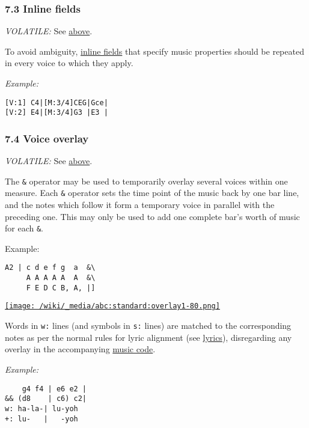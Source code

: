 \hypertarget{inline_fields}{\subsubsection{7.3 Inline
fields}\label{inline_fields}}

\emph{VOLATILE:} See \protect\hyperlink{multiple_voices}{above}.

To avoid ambiguity, \protect\hyperlink{inline_field_definition}{inline
fields} that specify music properties should be repeated in every voice
to which they apply.

\emph{Example:}

\begin{verbatim}
[V:1] C4|[M:3/4]CEG|Gce|
[V:2] E4|[M:3/4]G3 |E3 |
\end{verbatim}

\hypertarget{voice_overlay}{\subsubsection{7.4 Voice
overlay}\label{voice_overlay}}

\emph{VOLATILE:} See \protect\hyperlink{multiple_voices}{above}.

The \texttt{\&} operator may be used to temporarily overlay several
voices within one measure. Each \texttt{\&} operator sets the time point
of the music back by one bar line, and the notes which follow it form a
temporary voice in parallel with the preceding one. This may only be
used to add one complete bar's worth of music for each \texttt{\&}.

Example:

\begin{verbatim}
A2 | c d e f g  a  &\
     A A A A A  A  &\
     F E D C B, A, |]
\end{verbatim}

\href{/wiki/_detail/abc:standard:overlay1-80.png?id=abc\%3Astandard\%3Av2.1}{\texttt{[image: /wiki/\_media/abc:standard:overlay1-80.png]}}

Words in \texttt{w:} lines (and symbols in \texttt{s:} lines) are
matched to the corresponding notes as per the normal rules for lyric
alignment (see \protect\hyperlink{lyrics}{lyrics}), disregarding any
overlay in the accompanying
\protect\hyperlink{music_code_definition}{music code}.

\emph{Example:}

\begin{verbatim}
    g4 f4 | e6 e2 |
&& (d8    | c6) c2|
w: ha-la-| lu-yoh
+: lu-   |   -yoh
\end{verbatim}

